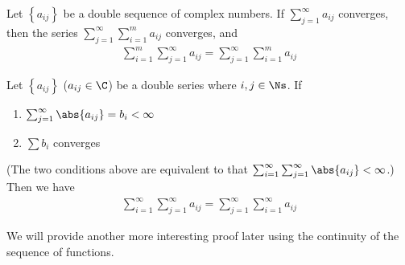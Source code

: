 \documentclass[thmcnt=section, 12pt]{elegantbook}
\begin{document}
\begin{proposition} \label{pro:1}
    Let $\left\{a_{ij}\right\}$ be a double sequence of complex numbers. If $\sum_{j=1}^\infty a_{ij}$ converges, then the series $\sum_{j=1}^\infty \sum_{i=1}^m a_{ij}$ converges, and
    \begin{align*}
        \sum_{i=1}^m \sum_{j=1}^\infty a_{ij}
        = \sum_{j=1}^\infty \sum_{i=1}^m a_{ij}
    \end{align*}
\end{proposition}


\begin{theorem} \label{thm:15}
    Let $\left\{a_{ij}\right\}$ ($a_{ij} \in \C$) be a double series where $i, j \in \Ns$. If 
    \begin{enumerate}
        \item $\sum_{j=1}^\infty \abs{a_{ij}}
        = b_i < \infty$
        \item $\sum b_i$ converges
    \end{enumerate}
    (The two conditions above are equivalent to that $\sum_{i=1}^\infty \sum_{j=1}^\infty \abs{a_{ij}} < \infty$.)
    Then we have 
    \begin{align*}
        \sum_{i=1}^\infty \sum_{j=1}^\infty a_{ij}
        = \sum_{j=1}^\infty \sum_{i=1}^\infty a_{ij}
    \end{align*}
\end{theorem}

\begin{remark}
    We will provide another more interesting proof later using the continuity of the sequence of functions.
\end{remark}
\end{document}
